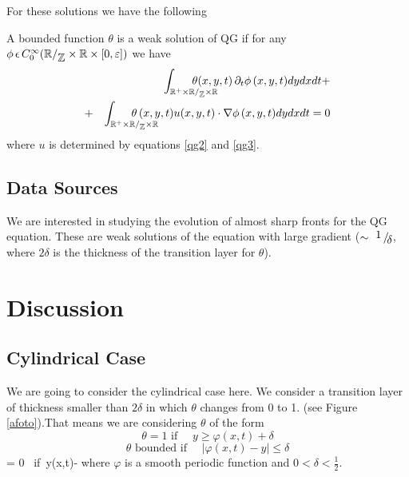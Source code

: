 \documentclass{pnastwo}
\begin{document}
\begin{article}
For these solutions we have the following

\begin{definition}
A bounded function $\theta$ is a weak solution of QG if for any
$\phi\,\epsilon\,
C_0^{\infty}(\mathbb{R}/_{\displaystyle{ \mathbb{Z}}}\times\mathbb{R}\times[0,\varepsilon])$ we have
\begin{eqnarray}
&&  \int_{\mathbb{R}^+\times\fd\times\mathbb{R}} \hspace{-25pt}
 \theta(x,y,t)\, \pr_t \phi
\,(x,y,t) dy dx dt+\nonumber\\
  & +&\int_{\mathbb{R}^+\times\fd\times\mathbb{R}}
\hspace{-26pt} \theta\,(x,y,t) u(x,y,t)\cdot\nabla\phi\,(x,y,t)
dydxdt = 0 \label{weaksol} \end{eqnarray}
where $u$ is determined by equations \eqref{qg2} and \eqref{qg3}.
\end{definition}

\subsection{Data Sources}
We are interested in studying the evolution of almost sharp fronts
for the QG equation. These are weak solutions of the equation with
large gradient ($\sim \displaystyle{ \inlinefrac{1}{\delta}}$, where $2
\delta$ is the thickness of the transition layer for $\theta$).

\section{Discussion}
\subsection{Cylindrical Case}
We are going to consider the cylindrical case here. We consider a
transition layer of thickness smaller than $2\delta$ in which
 $\theta$ changes from 0 to 1. (see Figure \ref{afoto}).That means we are considering $\theta$  of the form
\[
\theta  = 1   \mbox{ if }\quad  y\geq \varphi(x,t)+\delta
\]
\[
\theta \mbox{ bounded} \mbox{ if }\quad |\varphi(x,t)-y|\leq\delta
\]
\be \theta = 0  \mbox{ if }\quad  y\leq \varphi(x,t)-\delta
\label{theta} \ee
where $\varphi$ is a smooth periodic function and
$0<\delta<\frac{1}{2}$.



\end{article}
\end{document}
